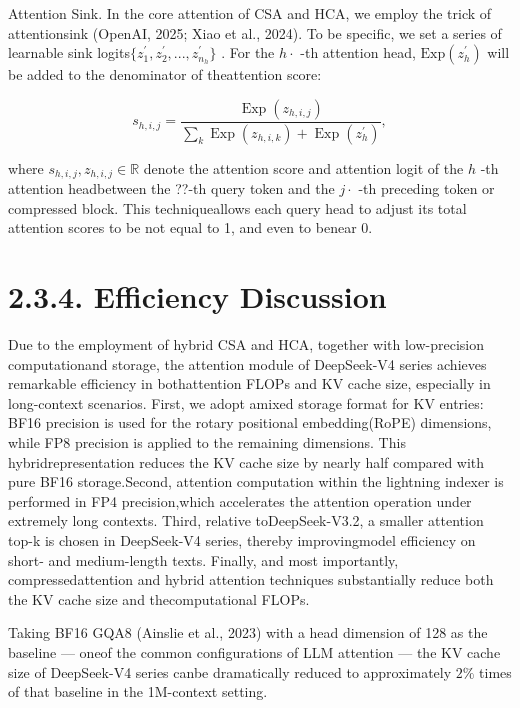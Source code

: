 \documentclass[
  10
]{article}
\begin{document}
Attention Sink. In the core attention of CSA and HCA, we employ the
trick of attentionsink (OpenAI, 2025; Xiao et al., 2024). To be
specific, we set a series of learnable sink
logits\(\{ z _ { 1 } ^ { \prime } , z _ { 2 } ^ { \prime } , . . . , z _ { n _ { h } } ^ { \prime } \}\)
. For the \(h \cdot\) -th attention head,
\(\mathrm { E x p } ( z _ { h } ^ { \prime } )\) will be added to the
denominator of theattention score:

\[
s _ {h, i, j} = \frac {\operatorname {E x p} \left(z _ {h , i , j}\right)}{\sum_ {k} \operatorname {E x p} \left(z _ {h , i , k}\right) + \operatorname {E x p} \left(z _ {h} ^ {\prime}\right)}, \tag {27}
\]

where \(s _ { h , i , j } , z _ { h , i , j } \in \mathbb { R }\) denote
the attention score and attention logit of the \(h\) -th attention
headbetween the ??-th query token and the \(j \cdot\) -th preceding
token or compressed block. This techniqueallows each query head to
adjust its total attention scores to be not equal to 1, and even to
benear 0.

\section{2.3.4. Efficiency Discussion}\label{efficiency-discussion}

Due to the employment of hybrid CSA and HCA, together with low-precision
computationand storage, the attention module of DeepSeek-V4 series
achieves remarkable efficiency in bothattention FLOPs and KV cache size,
especially in long-context scenarios. First, we adopt amixed storage
format for KV entries: BF16 precision is used for the rotary positional
embedding(RoPE) dimensions, while FP8 precision is applied to the
remaining dimensions. This hybridrepresentation reduces the KV cache
size by nearly half compared with pure BF16 storage.Second, attention
computation within the lightning indexer is performed in FP4
precision,which accelerates the attention operation under extremely long
contexts. Third, relative toDeepSeek-V3.2, a smaller attention top-k is
chosen in DeepSeek-V4 series, thereby improvingmodel efficiency on
short- and medium-length texts. Finally, and most importantly,
compressedattention and hybrid attention techniques substantially reduce
both the KV cache size and thecomputational FLOPs.

Taking BF16 GQA8 (Ainslie et al., 2023) with a head dimension of 128 as
the baseline --- oneof the common configurations of LLM attention ---
the KV cache size of DeepSeek-V4 series canbe dramatically reduced to
approximately \(2 \%\) times of that baseline in the 1M-context setting.
\end{document}
